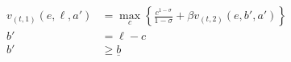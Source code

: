 \begin{align} \tag{1}
    v_{(t,1)}(e, \ell, a') & = \max_{c} \left\{\frac{c^{1-\sigma}}{1-\sigma} + \beta v_{(t,2)}(e,b',a') \right\}
    \\
    b'                     & = \ell - c
    \\
    b'                     & \geq \underline{b}
\end{align}
